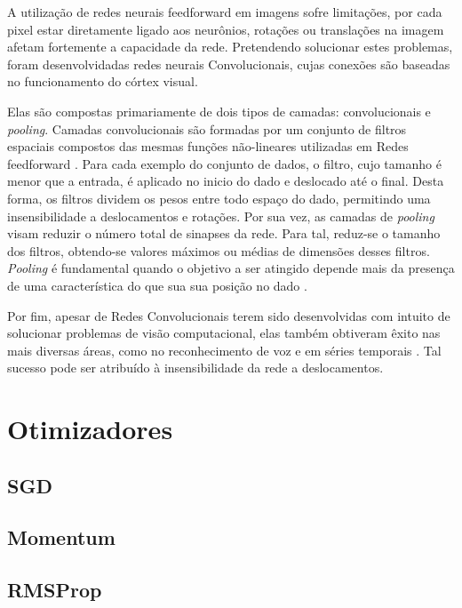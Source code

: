 A utilização de redes neurais feedforward em imagens sofre limitações, por cada pixel estar diretamente ligado aos neurônios, rotações ou translações na imagem afetam fortemente a capacidade da rede. Pretendendo solucionar estes problemas, foram desenvolvidadas redes neurais Convolucionais, cujas conexões são baseadas no funcionamento do córtex visual.

Elas são compostas primariamente de dois tipos de camadas: convolucionais e \textit{pooling}. Camadas convolucionais são formadas por um conjunto de filtros espaciais compostos das mesmas funções não-lineares utilizadas em Redes feedforward \cite{goodfellow16}. Para cada exemplo do conjunto de dados, o filtro, cujo tamanho é menor que a entrada, é aplicado no inicio do dado e deslocado até o final. Desta forma, os filtros dividem os pesos entre todo espaço do dado, permitindo uma insensibilidade a deslocamentos e rotações. Por sua vez, as camadas de \textit{pooling} visam reduzir o número total de sinapses da rede. Para tal, reduz-se o tamanho dos filtros, obtendo-se valores máximos ou médias de dimensões desses filtros. \textit{Pooling} é fundamental quando o objetivo a ser atingido depende mais da presença de uma característica do que sua sua posição no dado \cite{goodfellow16}.

Por fim, apesar de Redes Convolucionais terem sido desenvolvidas com intuito de solucionar problemas de visão computacional, elas também obtiveram êxito nas mais diversas áreas, como no reconhecimento de voz e em séries temporais \cite{lecun95}. Tal sucesso pode ser atribuído à insensibilidade da rede a deslocamentos.

\section{Otimizadores}

\subsection{SGD}

\subsection{Momentum}

\subsection{RMSProp}

